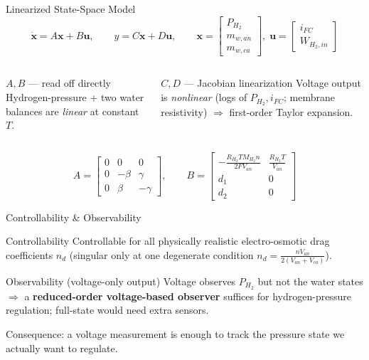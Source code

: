 \documentclass[aspectratio=169,11pt]{beamer}
\begin{document}
\begin{frame}{Linearized State-Space Model}
    \[
        \dot{\mathbf{x}}=A\mathbf{x}+B\mathbf{u},\qquad y=C\mathbf{x}+D\mathbf{u},
        \qquad
        \mathbf{x}=\!\begin{bmatrix}P_{H_2}\\ m_{w,an}\\ m_{w,ca}\end{bmatrix}\!,\;
        \mathbf{u}=\!\begin{bmatrix}i_{FC}\\ W_{H_2,in}\end{bmatrix}
    \]
    \begin{columns}[T]
        \begin{block}{$A,B$ --- read off directly}
            \footnotesize Hydrogen-pressure + two water balances are
            \emph{linear} at constant $T$.
        \end{block}
        \begin{block}{$C,D$ --- Jacobian linearization}
            \footnotesize Voltage output is \emph{nonlinear} (logs of
            $P_{H_2},i_{FC}$; membrane resistivity) $\Rightarrow$ first-order
            Taylor expansion.
        \end{block}
    \end{columns}
    \vspace{0.3em}
    \[
    A=\begin{bmatrix}0&0&0\\ 0&-\beta&\gamma\\ 0&\beta&-\gamma\end{bmatrix},\qquad
    B=\begin{bmatrix}
        -\tfrac{R_{H_2}T M_{H_2} n}{2F V_{an}} & \tfrac{R_{H_2}T}{V_{an}}\\
        d_1 & 0\\ d_2 & 0
    \end{bmatrix}
    \]
\end{frame}

\begin{frame}{Controllability \& Observability}
    \begin{block}{Controllability}
        \alert{Controllable} for all physically realistic electro-osmotic drag
        coefficients $n_d$ (singular only at one degenerate condition
        $n_d=\tfrac{nV_{an}}{2(V_{an}+V_{ca})}$).
    \end{block}
    \begin{block}{Observability (voltage-only output)}
        Voltage \alert{observes $P_{H_2}$ but not the water states}
        $\Rightarrow$ a \textbf{reduced-order voltage-based observer} suffices for
        hydrogen-pressure regulation; full-state would need extra sensors.
    \end{block}
    \vfill
    \centering\footnotesize
    Consequence: a voltage measurement is enough to track the pressure state we
    actually want to regulate.
\end{frame}
\end{document}

